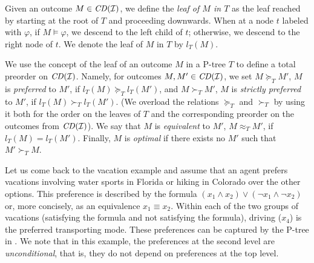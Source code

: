 Given an outcome $M \in \mathit{CD}(\mathcal{I})$, we define the \emph{leaf of $M$ in $T$}
as the leaf reached by starting at the root of $T$ and proceeding 
downwards. When at a node $t$ labeled with $\varphi$, if $M\models \varphi$, 
we descend to the left child of $t$; otherwise, we descend to the right node 
of $t$. We denote the leaf of $M$ in $T$ by $l_T(M)$.

We use the concept of the leaf of an outcome $M$ in a P-tree $T$ to 
define a total preorder on $\mathit{CD}(\mathcal{I})$. Namely, for outcomes
$M, M'\in \mathit{CD}(\mathcal{I})$, 
we set $M\succeq_T M'$, $M$ is \emph{preferred} to $M'$, if $l_T(M) \succeq_T l_T(M')$, and
$M\succ_T M'$, $M$ is \emph{strictly preferred} to $M'$, 
if $l_T(M) \succ_T l_T(M')$.
(We overload the relations $\succeq_T$ and $\succ_T$ 
by using it both for the order on the leaves of $T$ 
and the corresponding preorder on the outcomes from $\mathit{CD}(\mathcal{I})$). 
We say that $M$ is 
\emph{equivalent} to $M'$, $M \approx_T M'$, if $l_T(M)=l_T(M')$. 
Finally, $M$ is \emph{optimal} if there exists no 
$M'$ such that $M' \succ_T M$.

Let us come back to the vacation example and assume that an agent 
prefers vacations involving water sports in Florida or hiking in Colorado
over the other options. This preference is described by the formula
$(x_1\land x_2) \lor (\neg x_1 \land \neg x_2)$ or, more concisely, as 
an equivalence $x_1 \equiv x_2$.
Within each of the two groups of vacations 
(satisfying the formula and not satisfying the formula), 
driving ($x_4$) is the preferred transporting mode. These preferences can be captured by the P-tree in
. We note that in this example, the preferences at 
the second level are \emph{unconditional}, that is, they do not depend on 
preferences at the top level. 

